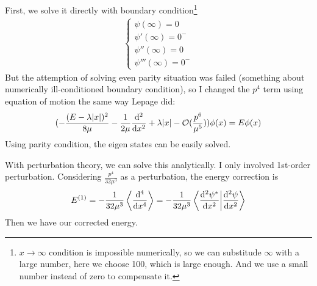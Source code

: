 \documentclass{article}
\begin{document}
First, we solve it directly with boundary condition\footnote{$x\rightarrow\infty$ condition is impossible numerically, so we can substitude $\infty$ with a large number, here we choose 100, which is large enough. And we use a small number instead of zero to compensate it.}
\begin{eqnarray}
    \begin{cases}
    \psi(\infty)=0\\
    \psi'(\infty)=0^-\\
    \psi''(\infty)=0\\
    \psi'''(\infty)=0^-
    \end{cases}
\end{eqnarray}
But the attemption of solving even parity situation was failed (something about numerically ill-conditioned boundary condition), so I changed the $p^4$ term using equation of motion the same way Lepage did:
\begin{equation}
  (-\frac{(E-\lambda\abs{x})^2}{8\mu}-\frac{1}{2\mu}\dv[2]{x}+\lambda\abs{x}-\mathcal{O}(\frac{p^6}{\mu^5}))\phi(x)=E\phi(x)
\end{equation}
Using parity condition, the eigen states can be easily solved.

With perturbation theory, we can solve this analytically. I only involved 1st-order perturbation. Considering $\frac{p^4}{32\mu^3}$ as a perturbation, the energy correction is
\begin{equation}
  E^{(1)}=-\frac{1}{32\mu^3}\expval{\dv[4]{x}}=-\frac{1}{32\mu^3}\braket{\dv[2]{\psi^*}{x}}{\dv[2]{\psi}{x}}
\end{equation}
Then we have our corrected energy.
\end{document}
